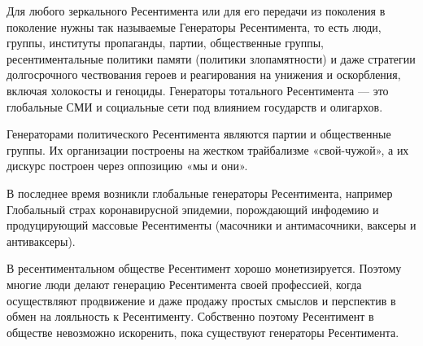Для любого зеркального Ресентимента или для его передачи из поколения в
поколение нужны так называемые Генераторы Ресентимента, то есть люди, группы,
институты пропаганды, партии, общественные группы, ресентиментальные политики
памяти (политики злопамятности) и даже стратегии долгосрочного чествования
героев и реагирования на унижения и оскорбления, включая холокосты и геноциды.
Генераторы тотального Ресентимента — это глобальные СМИ и социальные сети под
влиянием государств и олигархов.

Генераторами политического Ресентимента являются партии и общественные группы.
Их организации построены на жестком трайбализме «свой-чужой», а их дискурс
построен через оппозицию «мы и они».

В последнее время возникли глобальные генераторы Ресентимента, например
Глобальный страх коронавирусной эпидемии, порождающий инфодемию и продуцирующий
массовые Ресентименты (масочники и антимасочники, ваксеры и антиваксеры).

В ресентиментальном обществе Ресентимент хорошо монетизируется. Поэтому многие
люди делают генерацию Ресентимента своей профессией, когда осуществляют
продвижение и даже продажу простых смыслов и перспектив в обмен на лояльность к
Ресентименту. Собственно поэтому Ресентимент в обществе невозможно искоренить,
пока существуют генераторы Ресентимента.

